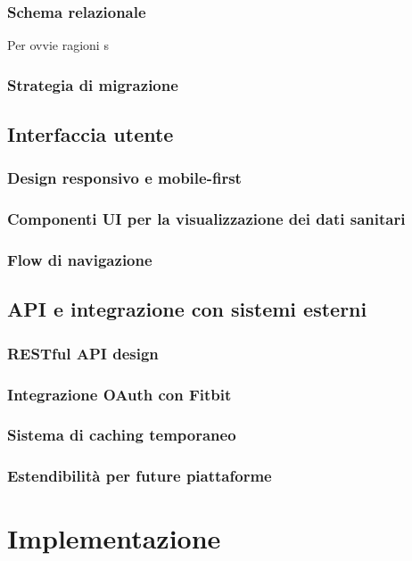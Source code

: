 \documentclass[12pt,a4paper,oneside]{report}
\begin{document}
\subsection{Schema relazionale}
Per ovvie ragioni s
\subsection{Strategia di migrazione}

\section{Interfaccia utente}
\subsection{Design responsivo e mobile-first}
\subsection{Componenti UI per la visualizzazione dei dati sanitari}
\subsection{Flow di navigazione}

\section{API e integrazione con sistemi esterni}
\subsection{RESTful API design}
\subsection{Integrazione OAuth con Fitbit}
\subsection{Sistema di caching temporaneo}
\subsection{Estendibilità per future piattaforme}





\chapter{Implementazione}
\end{document}
